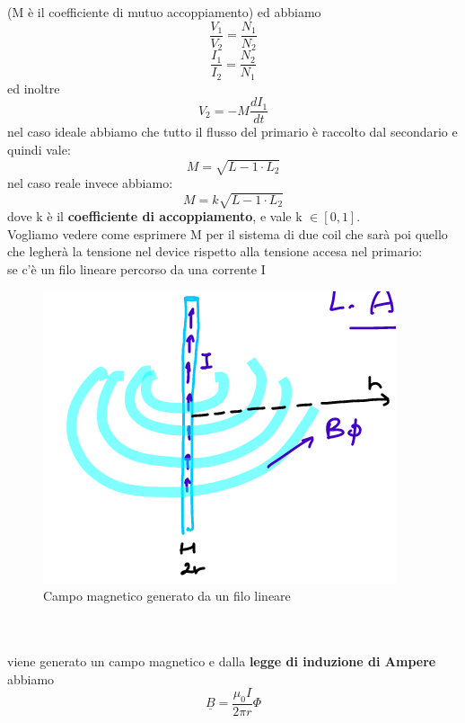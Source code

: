 \documentclass[oneside, 12pt]{extbook}
\begin{document}
(M è il coefficiente di mutuo accoppiamento) ed abbiamo 
\begin{equation}
	\frac{V_1}{V_2} = \frac{N_1}{N_2}
\end{equation}
\begin{equation}
	\frac{I_1}{I_2} = \frac{N_2}{N_1}
\end{equation}
ed inoltre
\begin{equation}
	V_2 = - M \frac{dI_1}{dt}
\end{equation}
nel caso ideale abbiamo che tutto il flusso del primario è raccolto dal secondario e quindi vale:
\begin{equation}
	M = \sqrt{L-1 \cdot L_2}
\end{equation}
nel caso reale invece abbiamo:
\begin{equation}
	M = k \sqrt{L-1 \cdot L_2}
\end{equation}
dove k è il \textbf{coefficiente di accoppiamento}, e vale k $\in [0,1]$.\\
Vogliamo vedere come esprimere M per il sistema di due coil che sarà poi quello che legherà la tensione nel device rispetto alla tensione accesa nel primario:\\se c'è un filo lineare percorso da una corrente I\\
\begin{figure}[!h]
	\includegraphics[scale=0.6]{immagini/corrente_filo.png}
	\caption{Campo magnetico generato da un filo lineare}
\end{figure}\\\\
viene generato un campo magnetico e dalla \textbf{legge di induzione di Ampere} abbiamo
\begin{equation}
	\underline{B} = \frac{\mu_0 I}{2 \pi r}\Phi
\end{equation}
\end{document}
